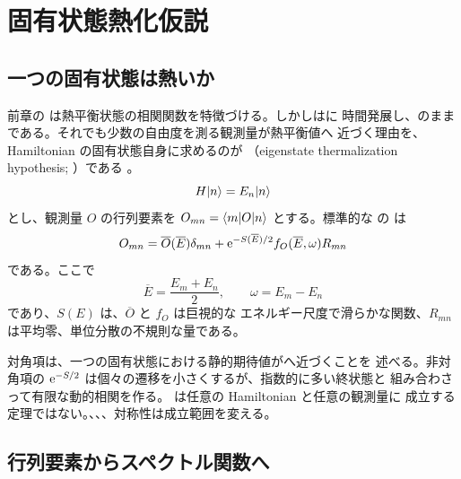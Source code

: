 \chapter{固有状態熱化仮説}
\label{chap:eth}
\section{一つの固有状態は熱いか}

前章の は熱平衡状態の相関関数を特徴づける。しかしはに
時間発展し、のままである。それでも少数の自由度を測る観測量が熱平衡値へ
近づく理由を、Hamiltonian の固有状態自身に求めるのが
（eigenstate thermalization hypothesis; ）である
\cite{Deutsch:1991,Srednicki:1994,Rigol:2008,DAlessio:2016}。
\begin{equation}
H\lvert n \rangle
=
E_n\lvert n \rangle
\end{equation}
とし、観測量 $O$ の行列要素を $O_{mn}=\langle m \rvert O\lvert n \rangle$ とする。標準的な  の
は
\begin{equation}
O_{mn}
=
\overline O(\overline E)\delta_{mn}
+\mathrm{e}^{-S(\overline E)/2}
f_O(\overline E,\omega)R_{mn}
\label{eq:eth-ansatz}
\end{equation}
である。ここで
\begin{equation}
\overline E
=
\frac{E_m+E_n}{2},
\qquad
\omega
=
E_m-E_n
\end{equation}
であり、$S(E)$ は、$\overline O$ と $f_O$ は巨視的な
エネルギー尺度で滑らかな関数、$R_{mn}$ は平均零、単位分散の不規則な量である。

対角項は、一つの固有状態における静的期待値がへ近づくことを
述べる。非対角項の $\mathrm{e}^{-S/2}$ は個々の遷移を小さくするが、指数的に多い終状態と
組み合わさって有限な動的相関を作る。 は任意の Hamiltonian と任意の観測量に
成立する定理ではない。、、、対称性は成立範囲を変える。

\section{行列要素からスペクトル関数へ}

